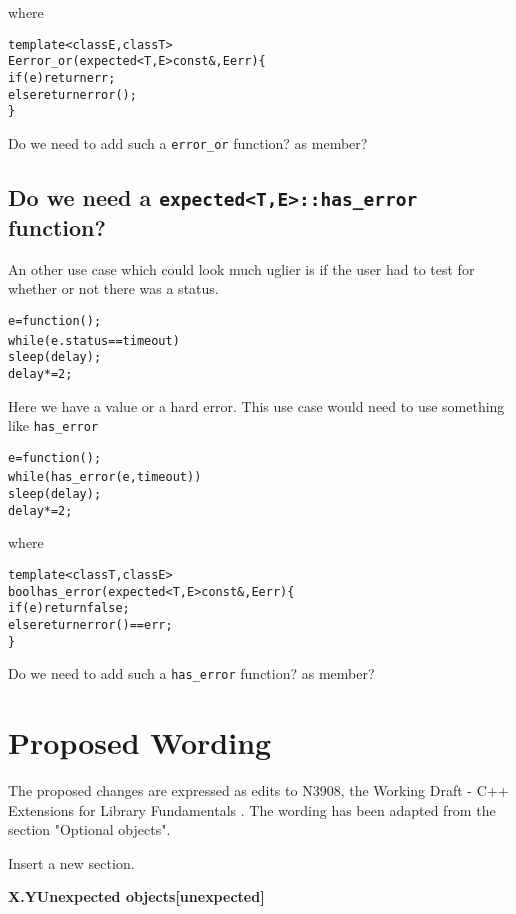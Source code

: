 \documentclass[a4paper,10pt]{article}
\newcommand{\wordingSec}[2]{\vspace{15pt}
\noindent
{\large\textbf{X.Y\quad #1\hfill\textbf{[#2]}}}
}
\newcommand{\cpp}[1]{\lstinline{#1}}
\begin{document}
\noindent
where

\begin{alltt}
template <class E, class T>
E error_or(expected<T,E> const&, E err) \{
  if(e) return err;
  else return error();
\}
\end{alltt}

\noindent
Do we need to add such a \cpp{error_or} function? as member? 

\subsection{Do we need a  \cpp{expected<T,E>::has_error}  function?}

An other use case which could look much uglier is if the user had to test for whether or not there was a status.

\begin{alltt}
  e = function();
  while ( e.status == timeout ) {
    sleep(delay);
    delay *=2;
  }
\end{alltt}

\noindent
Here we have a value or a hard error.  
This use case would need to use something like \cpp{has_error}

\begin{alltt}
  e = function();
  while ( has_error(e, timeout) ) {
    sleep(delay);
    delay *=2;
  }
\end{alltt}

\noindent
where

\begin{alltt}
template <class T, class E>
bool has_error(expected<T,E> const&, E err) \{
  if (e) return false;
  else return error()==err;
\}
\end{alltt}

Do we need to add such a \cpp{has_error} function? as member? 

\section{Proposed Wording}


The proposed changes are expressed as edits to N3908, the Working Draft - C++ Extensions for Library Fundamentals \cite{FundamentalsV1}. The wording has been adapted from the section  "Optional objects".
\newline

Insert a new section. 

\wordingSec{Unexpected objects}{unexpected}
\end{document}
